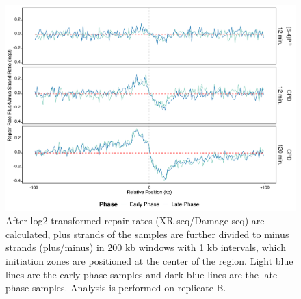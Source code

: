 \begin{figure}[H]
\begin{center}
\includegraphics[width=\textwidth]{Chapters/7_appendix/figures/supfig45}
\caption[Repair rate plus/minus ratio of initiation zones in 200 kb (replicate B).]{After log2-transformed repair rates (XR-seq/Damage-seq) are calculated, plus strands of the samples are further divided to minus strands (plus/minus) in 200 kb windows with 1 kb intervals, which initiation zones are positioned at the center of the region. Light blue lines are the early phase samples and dark blue lines are the late phase samples. Analysis is performed on replicate B.}
\label{supfig:rrpm200inzonesB}
\end{center}
\end{figure}

